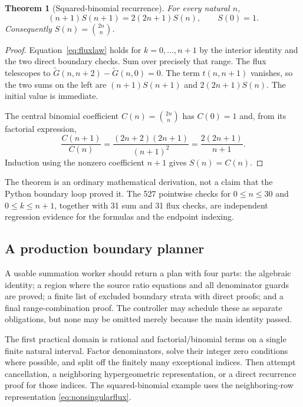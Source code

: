 \documentclass[11pt,letterpaper]{article}
\newtheorem{theorem}{Theorem}[section]
\theoremstyle{definition}\newtheorem{definition}[theorem]{Definition}
\theoremstyle{remark}\newtheorem{remark}[theorem]{Remark}
\begin{document}
\begin{theorem}[Squared-binomial recurrence]
For every natural $n$,
\begin{equation}
 (n+1)S(n+1)=2(2n+1)S(n),\qquad S(0)=1.
 \label{eq:binomrec}
\end{equation}
Consequently $S(n)=\binom{2n}{n}$.
\end{theorem}
\begin{proof}
Equation~\eqref{eq:fluxlaw} holds for $k=0,\ldots,n+1$ by the interior
identity and the two direct boundary checks. Sum over precisely that range.
The flux telescopes to
$\widetilde G(n,n+2)-\widetilde G(n,0)=0$. The term $t(n,n+1)$ vanishes, so
the two sums on the left are $(n+1)S(n+1)$ and $2(2n+1)S(n)$.
The initial value is immediate.

The central binomial coefficient $C(n)=\binom{2n}{n}$ has $C(0)=1$ and,
from its factorial expression,
\[
 \frac{C(n+1)}{C(n)}
 =\frac{(2n+2)(2n+1)}{(n+1)^2}
 =\frac{2(2n+1)}{n+1}.
\]
Induction using the nonzero coefficient $n+1$ gives $S(n)=C(n)$.
\end{proof}

The theorem is an ordinary mathematical derivation, not a claim that the Python
boundary loop proved it. The 527 pointwise checks for $0\le n\le30$ and
$0\le k\le n+1$, together with 31 sum and 31 flux checks, are independent
regression evidence for the formulas and the endpoint indexing.

\subsection{A production boundary planner}
A usable summation worker should return a plan with four parts: the algebraic
identity; a region where the source ratio equations and all denominator guards
are proved; a finite list of excluded boundary strata with direct proofs; and
a final range-combination proof. The controller may schedule these as separate
obligations, but none may be omitted merely because the main identity passed.

The first practical domain is rational and factorial/binomial terms on a single
finite natural interval. Factor denominators, solve their integer zero
conditions where possible, and split off the finitely many exceptional indices.
Then attempt cancellation, a neighboring hypergeometric representation, or a
direct recurrence proof for those indices. The squared-binomial example uses
the neighboring-row representation \eqref{eq:nonsingularflux}.
\end{document}
